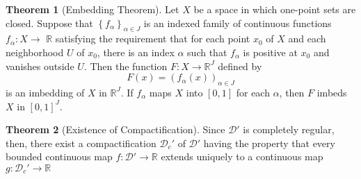 \documentclass{article}
\theoremstyle{definition}
\newtheorem{theorem}{Theorem}
\begin{document}
\begin{theorem}[Embedding Theorem]
    Let $X$ be a space in which one-point sets are closed. Suppose that $\left\{f_\alpha\right\}_{\alpha \in J}$ is an indexed family of continuous functions $f_\alpha: X \rightarrow$ $\mathbb{R}$ satisfying the requirement that for each point $x_0$ of $X$ and each neighborhood $U$ of $x_0$, there is an index $\alpha$ such that $f_\alpha$ is positive at $x_0$ and vanishes outside $U$. Then the function $F: X \rightarrow \mathbb{R}^J$ defined by
    $$
    F(x)=\left(f_\alpha(x)\right)_{\alpha \in J}
    $$
    is an imbedding of $X$ in $\mathbb{R}^J$. If $f_\alpha$ maps $X$ into $[0,1]$ for each $\alpha$, then $F$ imbeds $X$ in $[0,1]^J$.
\end{theorem}
\begin{theorem}[Existence of Compactification]
    Since $\mathcal{D'}$ is completely regular, then, there exist a compactification $\mathcal{D}_c'$ of $\mathcal{D'}$ having the property that every bounded continuous map $f:\mathcal{D'} \rightarrow \mathbb{R}$ extends uniquely to a continuous map $g:\mathcal{D}_c' \rightarrow \mathbb{R}$
\end{theorem}
\end{document}
